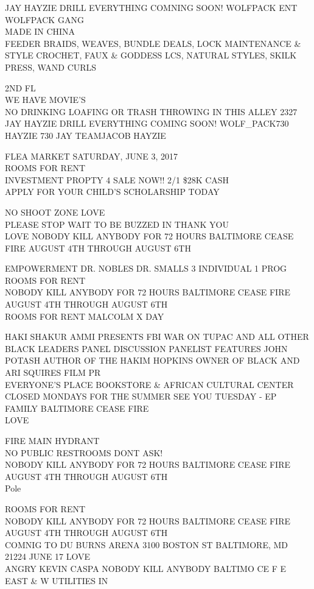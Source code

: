 \documentclass[10pt,letterpaper]{article}
\begin{document}
JAY HAYZIE DRILL EVERYTHING COMNING SOON!  WOLFPACK ENT WOLFPACK GANG\\
MADE IN CHINA\\
FEEDER BRAIDS, WEAVES, BUNDLE DEALS, LOCK MAINTENANCE \& STYLE CROCHET, FAUX \& GODDESS LCS, NATURAL STYLES, SKILK PRESS, WAND CURLS

2ND FL\\
WE HAVE MOVIE'S\\
NO DRINKING LOAFING OR TRASH THROWING IN THIS ALLEY 2327\\
JAY HAYZIE DRILL EVERYTHING COMING SOON! WOLF\_PACK730 HAYZIE 730 JAY TEAMJACOB HAYZIE

FLEA MARKET SATURDAY, JUNE 3, 2017\\
ROOMS FOR RENT\\
INVESTMENT PROPTY 4 SALE NOW!! 2/1 \$28K CASH\\
APPLY FOR YOUR CHILD'S SCHOLARSHIP TODAY

NO SHOOT ZONE LOVE\\
PLEASE STOP WAIT TO BE BUZZED IN THANK YOU\\
LOVE NOBODY KILL ANYBODY FOR 72 HOURS BALTIMORE CEASE FIRE AUGUST 4TH THROUGH AUGUST 6TH

EMPOWERMENT DR. NOBLES DR. SMALLS 3 INDIVIDUAL 1 PROG\\
ROOMS FOR RENT\\
NOBODY KILL ANYBODY FOR 72 HOURS BALTIMORE CEASE FIRE AUGUST 4TH THROUGH AUGUST 6TH\\
ROOMS FOR RENT MALCOLM X DAY

HAKI SHAKUR AMMI PRESENTS FBI WAR ON TUPAC AND ALL OTHER BLACK LEADERS PANEL DISCUSSION PANELIST FEATURES JOHN POTASH AUTHOR OF THE HAKIM HOPKINS OWNER OF BLACK AND ARI SQUIRES FILM PR\\
EVERYONE'S PLACE BOOKSTORE \& AFRICAN CULTURAL CENTER\\
CLOSED MONDAYS FOR THE SUMMER SEE YOU TUESDAY {-} EP FAMILY BALTIMORE CEASE FIRE\\
LOVE

FIRE MAIN HYDRANT\\
NO PUBLIC RESTROOMS DONT ASK!\\
NOBODY KILL ANYBODY FOR 72 HOURS BALTIMORE CEASE FIRE AUGUST 4TH THROUGH AUGUST 6TH\\
Pole

ROOMS FOR RENT\\
NOBODY KILL ANYBODY FOR 72 HOURS BALTIMORE CEASE FIRE AUGUST 4TH THROUGH AUGUST 6TH\\
COMNIG TO DU BURNS ARENA 3100 BOSTON ST BALTIMORE, MD 21224 JUNE 17 LOVE\\
ANGRY KEVIN CASPA NOBODY KILL ANYBODY BALTIMO CE F E EAST \& W UTILITIES IN
\end{document}
